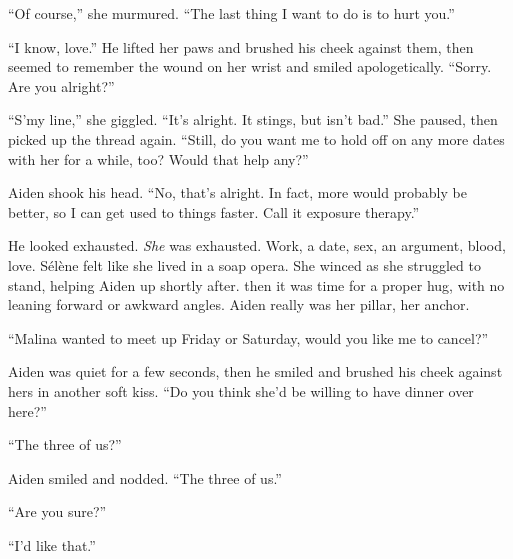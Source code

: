 ``Of course,'' she murmured. ``The last thing I want to do is to hurt you.''

``I know, love.'' He lifted her paws and brushed his cheek against them, then seemed to remember the wound on her wrist and smiled apologetically. ``Sorry. Are you alright?''

``S'my line,'' she giggled. ``It's alright. It stings, but isn't bad.'' She paused, then picked up the thread again. ``Still, do you want me to hold off on any more dates with her for a while, too? Would that help any?''

Aiden shook his head. ``No, that's alright. In fact, more would probably be better, so I can get used to things faster. Call it exposure therapy.''

He looked exhausted. \emph{She} was exhausted. Work, a date, sex, an argument, blood, love. Sélène felt like she lived in a soap opera. She winced as she struggled to stand, helping Aiden up shortly after. then it was time for a proper hug, with no leaning forward or awkward angles. Aiden really was her pillar, her anchor.

``Malina wanted to meet up Friday or Saturday, would you like me to cancel?''

Aiden was quiet for a few seconds, then he smiled and brushed his cheek against hers in another soft kiss. ``Do you think she'd be willing to have dinner over here?''

``The three of us?''

Aiden smiled and nodded. ``The three of us.''

``Are you sure?''

``I'd like that.''
